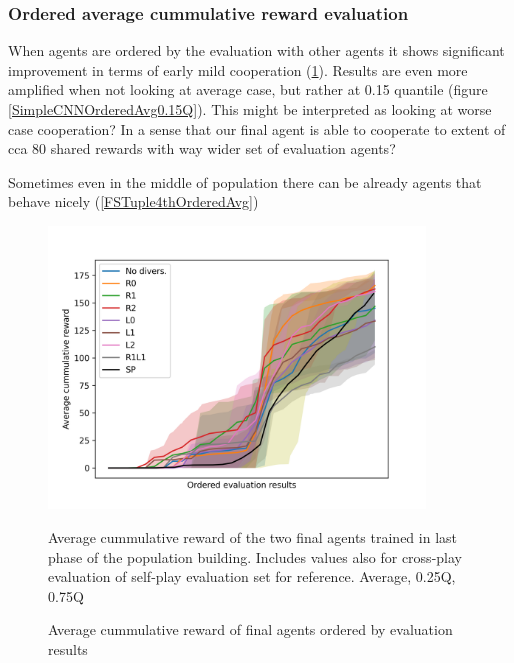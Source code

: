 \subsubsection{Ordered average cummulative reward evaluation}
When agents are ordered by the evaluation with other agents it shows significant improvement in terms of early mild cooperation (\ref{SimpleCNNOrderedAvg}). 
Results are even more amplified when not looking at average case, but rather at 0.15 quantile (figure \ref{SimpleCNNOrderedAvg0.15Q}).
{\color{blue} This might be interpreted as looking at worse case cooperation? In a sense that our final agent is able to cooperate to extent of cca 80 shared rewards with way wider set of evaluation agents? }

Sometimes even in the middle of population there can be already agents that behave nicely (\ref{FSTuple4thOrderedAvg})

\begin{figure}[!ht]
    \centering
    \includegraphics*[width=10cm]{../img/SimpleCNNOrderedAvg.png}

    \caption{Average cummulative reward of final agents ordered by evaluation results}
    \label{SimpleCNNOrderedAvg}
    \medskip
    \small 
    Average cummulative reward of the two final agents trained in last phase of the population building.
    Includes values also for cross-play evaluation of self-play evaluation set for reference. 
    Average, 0.25Q, 0.75Q

\end{figure}


